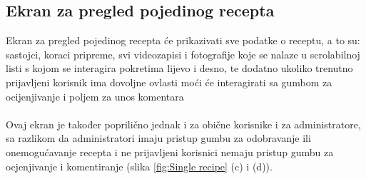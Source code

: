 \documentclass[times, utf8, zavrsni]{fer}
\begin{document}
\subsection{Ekran za pregled pojedinog recepta}
Ekran za pregled pojedinog recepta će prikazivati sve podatke o receptu, a to su:
sastojci, koraci pripreme, svi videozapisi i fotografije
koje se nalaze u scrolabilnoj listi s kojom se interagira pokretima lijevo i desno, te dodatno ukoliko
trenutno prijavljeni korisnik ima dovoljne ovlasti moći će interagirati sa gumbom za ocijenjivanje i
poljem za unos komentara
\\\\
Ovaj ekran je također poprilično jednak i za obične korisnike i za administratore,
sa razlikom da administratori imaju pristup gumbu za odobravanje ili onemogućavanje recepta i ne prijavljeni
korisnici nemaju pristup gumbu za ocjenjivanje i komentiranje (slika \ref{fig:Single recipe} (c) i (d)).
\end{document}
